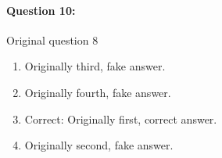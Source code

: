 \documentclass[9pt, twoside, twocolumn]{extarticle}
\begin{document}
\paragraph{Question 10:}
Original question 8

\begin{enumerate}[label=\textbf{{\Alph*}},labelindent=0pt, labelsep=1.5em, parsep=0.2em]
\item Originally third, fake answer.
\item Originally fourth, fake answer.
\item Correct: Originally first, correct answer.
\item Originally second, fake answer.
\end{enumerate}
\cleardoublepage
\newpage
\end{document}
